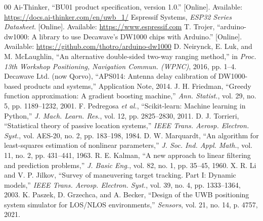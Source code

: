 \documentclass[conference]{IEEEtran}
\begin{document}
\begin{thebibliography}{00}
 Ai-Thinker, ``BU01 product specification, version 1.0.'' [Online]. Available: \url{https://docs.ai-thinker.com/en/uwb_1/}
 Espressif Systems, \textit{ESP32 Series Datasheet}. [Online]. Available: \url{https://www.espressif.com}
 T. Trojer, ``arduino-dw1000: A library to use Decawave's DW1000 chips with Arduino.'' [Online]. Available: \url{https://github.com/thotro/arduino-dw1000}
 D. Neirynck, E. Luk, and M. McLaughlin, ``An alternative double-sided two-way ranging method,'' in \textit{Proc. 13th Workshop Positioning, Navigation Commun. (WPNC)}, 2016, pp. 1--4.
 Decawave Ltd. (now Qorvo), ``APS014: Antenna delay calibration of DW1000-based products and systems,'' Application Note, 2014.
 J. H. Friedman, ``Greedy function approximation: A gradient boosting machine,'' \textit{Ann. Statist.}, vol. 29, no. 5, pp. 1189--1232, 2001.
 F. Pedregosa \textit{et al.}, ``Scikit-learn: Machine learning in Python,'' \textit{J. Mach. Learn. Res.}, vol. 12, pp. 2825--2830, 2011.
 D. J. Torrieri, ``Statistical theory of passive location systems,'' \textit{IEEE Trans. Aerosp. Electron. Syst.}, vol. AES-20, no. 2, pp. 183--198, 1984.
 D. W. Marquardt, ``An algorithm for least-squares estimation of nonlinear parameters,'' \textit{J. Soc. Ind. Appl. Math.}, vol. 11, no. 2, pp. 431--441, 1963.
 R. E. Kalman, ``A new approach to linear filtering and prediction problems,'' \textit{J. Basic Eng.}, vol. 82, no. 1, pp. 35--45, 1960.
 X. R. Li and V. P. Jilkov, ``Survey of maneuvering target tracking. Part I: Dynamic models,'' \textit{IEEE Trans. Aerosp. Electron. Syst.}, vol. 39, no. 4, pp. 1333--1364, 2003.
 K. Paszek, D. Grzechca, and A. Becker, ``Design of the UWB positioning system simulator for LOS/NLOS environments,'' \textit{Sensors}, vol. 21, no. 14, p. 4757, 2021.
\end{thebibliography}
\end{document}
